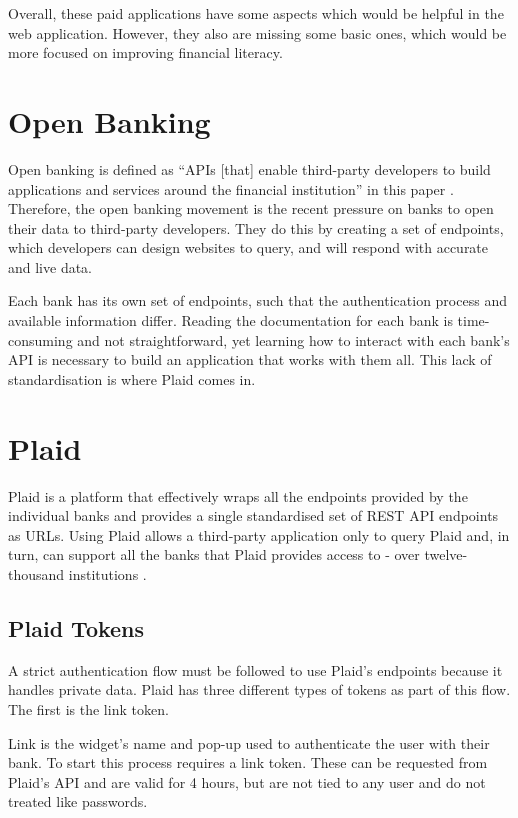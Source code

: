Overall, these paid applications have some aspects which would be helpful in the web application. However, they also are missing some basic ones, which would be more focused on improving financial literacy.

\section{Open Banking}
\label{sec:open-banking}
Open banking is defined as ``APIs [that] enable third-party developers to build applications and services around the financial institution'' in this paper \cite{OpenBankingDefinition}. Therefore, the open banking movement is the recent pressure on banks to open their data to third-party developers. They do this by creating a set of endpoints, which developers can design websites to query, and will respond with accurate and live data.

Each bank has its own set of endpoints, such that the authentication process and available information differ. Reading the documentation for each bank is time-consuming and not straightforward, yet learning how to interact with each bank's API is necessary to build an application that works with them all. This lack of standardisation is where Plaid \cite{Plaid} comes in.

\section{Plaid}
\label{sec:plaid}
Plaid is a platform that effectively wraps all the endpoints provided by the individual banks and provides a single standardised set of REST API endpoints as URLs. Using Plaid allows a third-party application only to query Plaid and, in turn, can support all the banks that Plaid provides access to - over twelve-thousand institutions \cite{PlaidInstitutions}.

\subsection{Plaid Tokens}
A strict authentication flow must be followed to use Plaid's endpoints because it handles private data. Plaid has three different types of tokens as part of this flow. The first is the link token.

Link is the widget's name and pop-up used to authenticate the user with their bank. To start this process requires a link token. These can be requested from Plaid's API and are valid for 4 hours, but are not tied to any user and do not treated like passwords.

